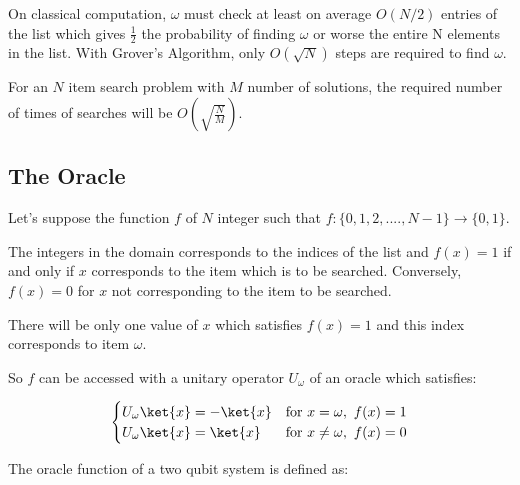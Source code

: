 \documentclass{article}
\begin{document}
\noindent
On classical computation, $\omega$ must check at least on average $O(N/2)$ entries of the list which gives $\frac{1}{2}$ the probability of finding $\omega$ or worse the entire N elements in the list.
With Grover's Algorithm, only $O(\sqrt{N})$ steps are required to find $\omega$.
\vspace{5mm}

\noindent
For an $N$ item search problem with $M$ number of solutions, the required number of times of searches will be $O(\sqrt{\frac{N}{M}})$\cite{nielsen_quantum_2010}.
\pagebreak

\subsection{The Oracle} \label{The Oracle}
\vspace{5mm}

Let's suppose the function $f$ of $N$ integer such that $f:\{0,1, 2,...., N-1\} \rightarrow{\{0,1\}}$. 
\vspace{5mm}

\noindent
The integers in the domain corresponds to the indices of the list and $f(x) =1$ if and only if $x$ corresponds to the item which is to be searched. Conversely, $f(x) =0$ for $x$ not corresponding to the item to be searched. 
\vspace{5mm}

\noindent
There will be only one value of $x$ which satisfies $f(x)=1$ and this index corresponds to item $\omega$\cite{noauthor_grovers_2022}.
\vspace{5mm}

\noindent
So $f$ can be accessed with a unitary operator $U_{\omega}$ of  an oracle which satisfies:
\vspace{5mm}

\begin{equation}
\begin{cases}
      U_{\omega}\ket{x} = -\ket{x}  & \text{for} \ x = \omega, \ f(x) =1 \\
       U_{\omega}\ket{x} = \ket{x}  & \text{for} \ x \neq \omega, \ f(x) = 0 \\
\end{cases}  
\end{equation}

\vspace{5mm}

The oracle function of a two qubit system is defined as\cite{j_quantum_2020}:
\vspace{5mm}
\end{document}
